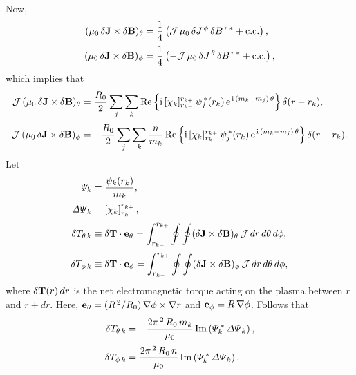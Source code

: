 \documentclass[12pt]{article}
\begin{document}
Now,
\begin{align}
(\mu_0\,\delta{\bf J}\times \delta {\bf B})_\theta&= \frac{1}{4}\left({\cal J}\,\mu_0\,\delta J^{\,\phi}\,\delta B^{\,r\,\ast}+{\rm c.c.}\right),\\[0.5ex]
(\mu_0\,\delta{\bf J}\times \delta {\bf B})_\phi&= \frac{1}{4}\left(-{\cal J}\,{\mu_0}\,\delta J^{\,\theta}\,\delta B^{\,r\,\ast}+{\rm c.c.}\right),
\end{align}
which implies that
\begin{align}
{\cal J}\,(\mu_0\,\delta{\bf J}\times \delta {\bf B})_\theta&=\frac{R_0}{2}\sum_j\sum_k {\rm Re}\left\{{\rm i}\,[\chi_k]_{r_{k-}}^{r_{k+}}\,\psi_j^{\,\ast}(r_k)\,{\rm e}^{\,{\rm i}\,(m_k-m_j)\,\theta}\right\}\delta(r-r_k),\\[0.5ex]
{\cal J}\,(\mu_0\,\delta {\bf J}\times \delta {\bf B})_\phi&= -\frac{R_0}{2}\sum_j\sum_k \frac{n}{m_k}\, {\rm Re}\left\{{\rm i}\,[\chi_k]_{r_{k-}}^{r_{k+}}\,\psi_j^{\,\ast}(r_k)\,{\rm e}^{\,{\rm i}\,(m_k-m_j)\,\theta}\right\}\delta(r-r_k).
\end{align}
Let
\begin{align}
{\mit\Psi}_k      &= \frac{\psi_k(r_k)}{m_k},\label{e102}\\[0.5ex]
{\mit\Delta\Psi}_k&=\left[\chi_k\right]_{r_{k-}}^{r_{k+}},\label{e103}\\[0.5ex]
\delta T_{\theta\,k} &\equiv \delta {\bf T}\cdot{\bf e}_\theta= \int_{r_{k-}}^{r_{k+}}\oint\oint (\delta {\bf J}\times \delta {\bf B})_\theta\,{\cal J}\,dr\,d\theta\,d\phi,\\[0.5ex]
\delta T_{\phi\,k} &\equiv \delta {\bf T}\cdot{\bf e}_\phi= \int_{r_{k-}}^{r_{k+}}\oint\oint (\delta {\bf J}\times \delta {\bf B})_\phi\,{\cal J}\,dr\,d\theta\,d\phi,
\end{align}
where $\delta{\bf T}(r)\,dr$ is the net electromagnetic torque acting on the plasma between $r$ and $r+dr$.  Here, ${\bf e}_\theta= (R^{\,2}/R_0)\,\nabla\phi\times\nabla r$ and
${\bf e}_\phi = R\,\nabla\phi$. 
Follows that
\begin{align}
\delta T_{\theta\,k} &= -\frac{2\pi^{\,2}\,R_0\,m_k}{\mu_0}\,{\rm Im}\left({\mit\Psi}_k^{\,\ast}\,{\mit\Delta\Psi}_k\right),\label{et1}\\[0.5ex]
\delta T_{\phi\,k} &= \frac{2\pi^{\,2}\,R_0\,n}{\mu_0}\,{\rm Im}\left({\mit\Psi}_k^{\,\ast}\,{\mit\Delta\Psi}_k\right).\label{et2}
\end{align}
\end{document}
